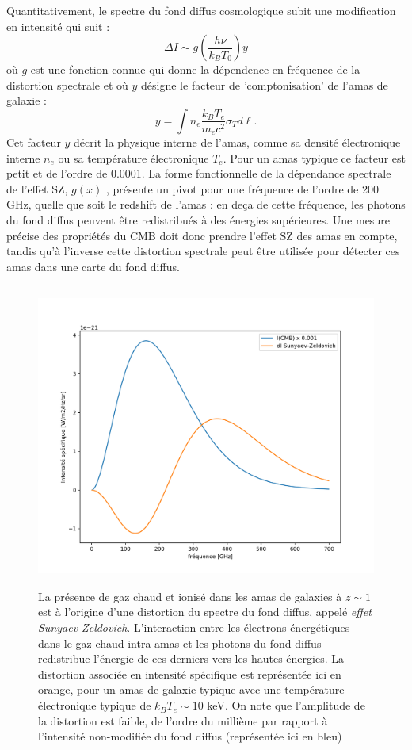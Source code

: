Quantitativement, le spectre du fond diffus cosmologique subit une modification en intensité qui suit :
\begin{equation}
\Delta I \sim g(\frac{h\nu}{k_B T_0}) y
\end{equation}
où $g$ est une fonction connue qui donne la dépendence en fréquence de la distortion spectrale et où $y$ désigne le facteur de 'comptonisation' de l'amas de galaxie :
\begin{equation}
y=\int n_e \frac{k_B T_e}{m_e c^2} \sigma_T d\ell.
\end{equation} 
Cet facteur $y$ décrit la physique interne de l'amas, comme sa densité électronique interne $n_e$ ou sa température électronique $T_e$. Pour un amas typique ce facteur est petit et de l'ordre de 0.0001. La forme fonctionnelle de la dépendance spectrale de l'effet SZ, $g(x)$ , présente un pivot pour une fréquence de l'ordre de 200 GHz, quelle que soit le redshift de l'amas : en deça de cette fréquence, les photons du fond diffus peuvent être redistribués à des énergies supérieures. Une mesure précise des propriétés du CMB doit donc prendre l'effet SZ des amas en compte, tandis qu'à l'inverse cette distortion spectrale peut être utilisée pour détecter ces amas dans une carte du fond diffus.
\begin{figure}[htbp]
	\centering
		\includegraphics[height=10cm]{figs/SZ.png}
		\caption[L'effet SZ]{La présence de gaz chaud et ionisé dans les amas de galaxies à $z\sim 1$ est à l'origine d'une distortion du spectre du fond diffus, appelé \textit{effet Sunyaev-Zeldovich}. L'interaction entre les électrons énergétiques dans le gaz chaud intra-amas et les photons du fond diffus redistribue l'énergie de ces derniers vers les hautes énergies. La distortion associée en intensité spécifique est représentée ici en orange, pour un amas de galaxie typique avec une température électronique typique de $k_B T_e \sim 10$ keV. On note que l'amplitude de la distortion est faible, de l'ordre du millième par rapport à l'intensité non-modifiée du fond diffus (représentée ici en bleu) }
	\label{f:SZ}
\end{figure}

